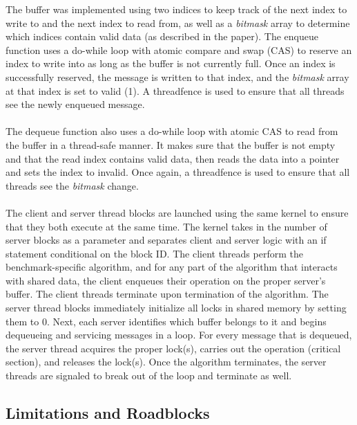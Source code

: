 \documentclass{article}
\begin{document}
The buffer was implemented using two indices to keep track of the next index to write to and the next index to read from, as well as a \textit{bitmask} array to determine which indices contain valid data (as described in the paper). The enqueue function uses a do-while loop with atomic compare and swap (CAS) to reserve an index to write into as long as the buffer is not currently full. Once an index is successfully reserved, the message is written to that index, and the \textit{bitmask} array at that index is set to valid (1). A threadfence is used to ensure that all threads see the newly enqueued message.
\\
\\
The dequeue function also uses a do-while loop with atomic CAS to read from the buffer in a thread-safe manner. It makes sure that the buffer is not empty and that the read index contains valid data, then reads the data into a pointer and sets the index to invalid. Once again, a threadfence is used to ensure that all threads see the \textit{bitmask} change.
\\
\\
The client and server thread blocks are launched using the same kernel to ensure that they both execute at the same time. The kernel takes in the number of server blocks as a parameter and separates client and server logic with an if statement conditional on the block ID. The client threads perform the benchmark-specific algorithm, and for any part of the algorithm that interacts with shared data, the client enqueues their operation on the proper server's buffer. The client threads terminate upon termination of the algorithm. The server thread blocks immediately initialize all locks in shared memory by setting them to 0. Next, each server identifies which buffer belongs to it and begins dequeueing and servicing messages in a loop. For every message that is dequeued, the server thread acquires the proper lock(s), carries out the operation (critical section), and releases the lock(s). Once the algorithm terminates, the server threads are signaled to break out of the loop and terminate as well.

\subsection{Limitations and Roadblocks}
\end{document}
